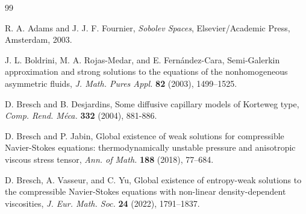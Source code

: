 \documentclass[11pt,reqno]{amsart}
\numberwithin{rk}{section}
\numberwithin{prop}{section}
\numberwithin{mydef}{section}
\numberwithin{lem}{section}
\numberwithin{equation}{section}
\numberwithin{thm}{section}
\begin{document}
\bigskip

\begin{thebibliography}{99}













 

 
 
 


















              













	 R. A. Adams and  J. J. F. Fournier, \textit{Sobolev Spaces}, Elsevier/Academic Press, Amsterdam, 2003.







 J. L.  Boldrini,  M. A.  Rojas-Medar, and  E. Fern\'andez-Cara, Semi-Galerkin approximation and strong solutions to the equations of the nonhomogeneous asymmetric fluids, \textit{J. Math. Pures  Appl.} \textbf{82} (2003), 1499--1525.



 D. Bresch and  B. Desjardins,  Some diffusive capillary  models of Korteweg type, \textit{Comp. Rend. M\'eca.}   \textbf{332}  (2004), 881-886.


              






D. Bresch and P. Jabin, Global existence of weak solutions for compressible Navier-Stokes equations: thermodynamically unstable pressure and anisotropic viscous stress tensor,   
\textit{Ann. of Math.} \textbf{188} (2018), 77--684.





 D. Bresch, A. Vasseur, and C. Yu, Global existence of entropy-weak solutions to the compressible Navier-Stokes equations with non-linear density-dependent viscosities, \textit{J. Eur. Math. Soc.} \textbf{24} (2022), 1791--1837.






\end{thebibliography}
\end{document}
